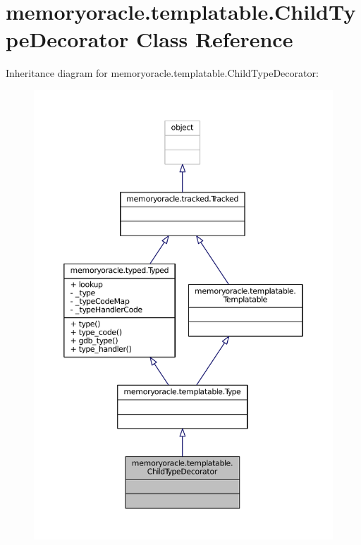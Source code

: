 \hypertarget{classmemoryoracle_1_1templatable_1_1ChildTypeDecorator}{}\section{memoryoracle.\+templatable.\+Child\+Type\+Decorator Class Reference}
\label{classmemoryoracle_1_1templatable_1_1ChildTypeDecorator}


Inheritance diagram for memoryoracle.\+templatable.\+Child\+Type\+Decorator\+:\nopagebreak
\begin{figure}[H]
\begin{center}
\leavevmode
\includegraphics[width=350pt]{classmemoryoracle_1_1templatable_1_1ChildTypeDecorator__inherit__graph}
\end{center}
\end{figure}


